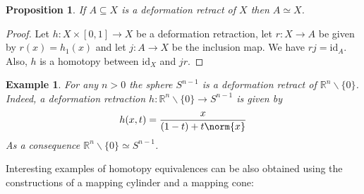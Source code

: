 \documentclass[11pt, letterpaper, oneside]{report}
\theoremstyle{pplain}
\newtheorem{proposition}[theorem]{Proposition}
\theoremstyle{ddefinition}
\newtheorem{example}[theorem]{Example}
\theoremstyle{nnn}
\theoremstyle{eexercise}
\newcommand{\R}{{\mathbb R}}
\newcommand{\id}{\mathrm{id}}
\newcommand{\ssmin}{\smallsetminus}
\begin{document}
\begin{proposition}
If $A\subseteq X$ is a deformation retract of $X$ then $A\simeq X$. 
\end{proposition}

\begin{proof}
Let $h\colon X \times [0, 1]\to X$ be a deformation retraction, let $r\colon X \to A$ be given by 
$r(x) = h_{1}(x)$ and let $j\colon A \to X$ be the inclusion map. We have $rj = \id_{A}$. Also, 
$h$ is a homotopy between $\id_{X}$ and $jr$. 
\end{proof}


\begin{example}
\label{DEFRETR EX}
For any $n > 0$ the sphere $S^{n-1}$ is a deformation retract of $\R^{n}\ssmin \{0\}$. 
Indeed, a deformation retraction $h\colon \R^{n}\ssmin \{0\} \to S^{n-1}$ is given by 
$$h(x, t) = \frac{x}{(1-t) + t\norm{x}}$$
As a consequence $\R^{n}\ssmin \{0\} \simeq S^{n-1}$.
\end{example}


Interesting examples of homotopy equivalences can be also obtained using the constructions 
of a mapping cylinder and a mapping cone:
\end{document}
